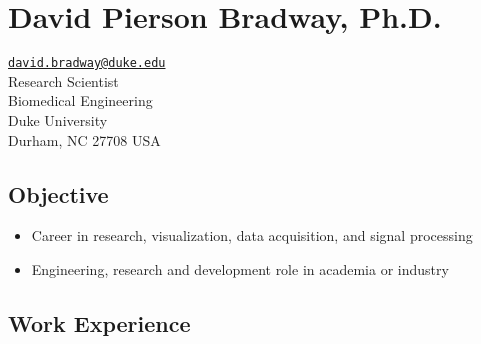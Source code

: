 \documentclass[
]{article}
\author{}
\date{}
\providecommand{\tightlist}{%
  \setlength{\itemsep}{0pt}\setlength{\parskip}{0pt}}
\begin{document}
\hypertarget{david-pierson-bradway-ph.d.}{%
\section{David Pierson Bradway,
Ph.D.~}\label{david-pierson-bradway-ph.d.}}

\href{mailto:david.bradway@duke.edu}{\nolinkurl{david.bradway@duke.edu}}\\
Research Scientist\\
Biomedical Engineering\\
Duke University\\
Durham, NC 27708 USA

\hypertarget{objective}{%
\subsection{Objective}\label{objective}}

\begin{itemize}
\tightlist
\item
  Career in research, visualization, data acquisition, and signal
  processing
\item
  Engineering, research and development role in academia or industry
\end{itemize}

\hypertarget{work-experience}{%
\subsection{Work Experience}\label{work-experience}}
\end{document}
